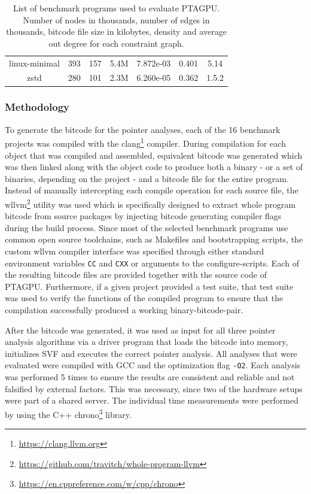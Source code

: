 \begin{table}
\begin{tabular}{||c c c c S[table-format = 1.3,retain-zero-exponent=true] c c||}
        linux-minimal & 393  & 157  & 5.4M    & 7.872e-03 & 0.401       & 5.14    \\
        zstd          & 280  & 101  & 2.3M    & 6.260e-05 & 0.362       & 1.5.2   \\
        \hline
    \end{tabular}
    \caption[List of benchmark programs used to evaluate PTAGPU]{List of benchmark programs used to evaluate PTAGPU.\\Number of nodes in thousands, number of edges in thousands, bitcode file size in kilobytes, density and average out degree for each constraint graph.}
    \label{tab:benchmarkprograms}
\end{table}

\subsubsection{Methodology}
To generate the bitcode for the pointer analyses, each of the 16 benchmark projects was compiled with the clang\footnote{\url{https://clang.llvm.org}} compiler. During compilation for each object that was compiled and assembled, equivalent bitcode was generated which was then linked along with the object code to produce both a binary - or a set of binaries, depending on the project - and a bitcode file for the entire program.
Instead of manually intercepting each compile operation for each source file, the wllvm\footnote{\url{https://github.com/travitch/whole-program-llvm}} utility was used which is specifically designed to extract whole program bitcode from source packages by injecting bitcode generating compiler flags during the build process.
Since most of the selected benchmark programs use common open source toolchains, such as Makefiles and bootstrapping scripts, the custom wllvm compiler interface was specified through either standard environment variables  \verb|CC| and  \verb|CXX| or arguments to the configure-scripts.
Each of the resulting bitcode files are provided together with the source code of PTAGPU.
Furthermore, if a given project provided a test suite, that test suite was used to verify the functions of the compiled program to ensure that the compilation successfully produced a working binary-bitcode-pair. 

After the bitcode was generated, it was used as input for all three pointer analysis algorithms via a driver program that loads the bitcode into memory, initializes SVF and executes the correct pointer analysis.
All analyses that were evaluated were compiled with GCC and the optimization flag \verb|-O2|.
Each analysis was performed 5 times to ensure the results are consistent and reliable and not falsified by external factors. This was necessary, since two of the hardware setups were part of a shared server.
The individual time measurements were performed by using the C++ chrono\footnote{\url{https://en.cppreference.com/w/cpp/chrono}} library.

